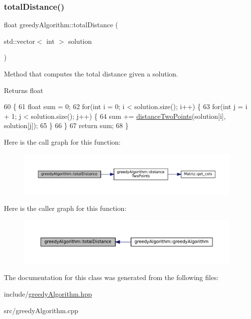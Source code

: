 \subsubsection{\texorpdfstring{total\+Distance()}{totalDistance()}}
{\footnotesize\ttfamily float greedy\+Algorithm\+::total\+Distance (\begin{DoxyParamCaption}\item[{std\+::vector$<$ int $>$}]{solution }\end{DoxyParamCaption})}



Method that computes the total distance given a solution. 

\begin{DoxyReturn}{Returns}
float 
\end{DoxyReturn}

\begin{DoxyCode}
60                                                             \{
61   \textcolor{keywordtype}{float} sum = 0;
62   \textcolor{keywordflow}{for}(\textcolor{keywordtype}{int} i = 0; i < solution.size(); i++) \{
63     \textcolor{keywordflow}{for}(\textcolor{keywordtype}{int} j = i + 1; j < solution.size(); j++) \{
64       sum += \hyperlink{classgreedyAlgorithm_a59dd977d1c232276b8494de999e415d4}{distanceTwoPoints}(solution[i], solution[j]);
65     \}
66   \}
67   \textcolor{keywordflow}{return} sum;
68 \}
\end{DoxyCode}
Here is the call graph for this function\+:
\nopagebreak
\begin{figure}[H]
\begin{center}
\leavevmode
\includegraphics[width=350pt]{classgreedyAlgorithm_a523e81ad05f34731d5259e712b0b6ee5_cgraph}
\end{center}
\end{figure}
Here is the caller graph for this function\+:
\nopagebreak
\begin{figure}[H]
\begin{center}
\leavevmode
\includegraphics[width=350pt]{classgreedyAlgorithm_a523e81ad05f34731d5259e712b0b6ee5_icgraph}
\end{center}
\end{figure}


The documentation for this class was generated from the following files\+:\begin{DoxyCompactItemize}
\item 
include/\hyperlink{greedyAlgorithm_8hpp}{greedy\+Algorithm.\+hpp}\item 
src/greedy\+Algorithm.\+cpp\end{DoxyCompactItemize}
